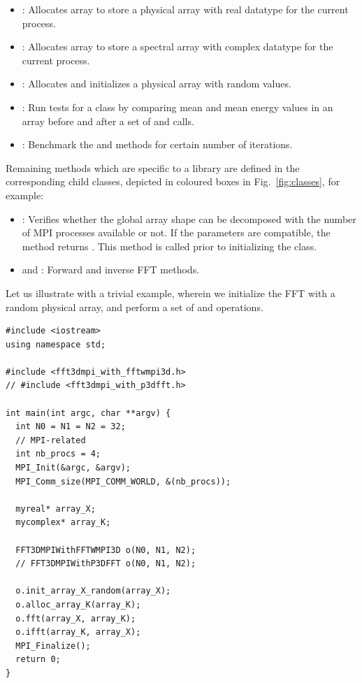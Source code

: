 \begin{itemize}
  \item {}: Allocates array to store a physical array
    with real datatype for the current process.
  \item {}: Allocates array to store a spectral array
    with complex datatype  for the current process.
  \item {}: Allocates and initializes a physical
    array with random values.
  \item {}: Run tests for a class by comparing mean and mean energy
    values in an array before and after a set of  and
     calls.
  \item {}: Benchmark the  and
     methods for certain number of iterations.
\end{itemize}

Remaining methods which are specific to a library are defined in the
corresponding child classes, depicted in coloured boxes in
Fig.~\ref{fig:classes}, for example:

\begin{itemize}
  \item {}: Verifies whether the global array
    shape can be decomposed with the number of MPI processes available or not.
    If the parameters are compatible, the method returns .
    This method is called prior to initializing the class.
  \item {} and : Forward and inverse FFT
    methods.
\end{itemize}

Let us illustrate with a trivial example, wherein we initialize the FFT with a
random physical array, and perform a set of  and 
operations.
\begin{verbatim}
#include <iostream>
using namespace std;

#include <fft3dmpi_with_fftwmpi3d.h>
// #include <fft3dmpi_with_p3dfft.h>

int main(int argc, char **argv) {
  int N0 = N1 = N2 = 32;
  // MPI-related
  int nb_procs = 4;
  MPI_Init(&argc, &argv);
  MPI_Comm_size(MPI_COMM_WORLD, &(nb_procs));

  myreal* array_X;
  mycomplex* array_K;

  FFT3DMPIWithFFTWMPI3D o(N0, N1, N2);
  // FFT3DMPIWithP3DFFT o(N0, N1, N2);

  o.init_array_X_random(array_X);
  o.alloc_array_K(array_K);
  o.fft(array_X, array_K);
  o.ifft(array_K, array_X);
  MPI_Finalize();
  return 0;
}
\end{verbatim}

